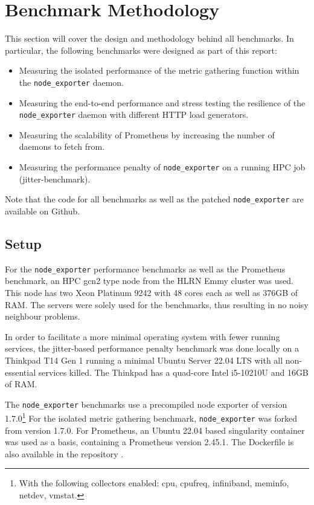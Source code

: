 \section{Benchmark Methodology}
This section will cover the design and methodology behind all benchmarks. In particular, the following
benchmarks were designed as part of this report:

\begin{itemize}
  \item Measuring the isolated performance of the metric gathering function within the \texttt{node\_exporter} daemon.
  \item Measuring the end-to-end performance and stress testing the resilience of the \texttt{node\_exporter} daemon with different HTTP load generators.
  \item Measuring the scalability of Prometheus by increasing the number of daemons to fetch from.
  \item Measuring the performance penalty of \texttt{node\_exporter} on a running \ac{HPC} job (jitter-benchmark).
\end{itemize}

Note that the code for all benchmarks \cite{my_repo} as well as the patched \texttt{node\_exporter} \cite{my_node_exporter}
are available on Github.

\subsection{Setup}

For the \texttt{node\_exporter} performance benchmarks as well as the Prometheus benchmark, an \ac{HPC} 
gcn2 type node from the HLRN Emmy cluster was used. This node has two Xeon Platinum 9242 with 48 cores each
as well as 376GB of RAM. The servers were solely used for the benchmarks, thus resulting in
no noisy neighbour problems.

In order to facilitate a more minimal operating system with fewer running services, the jitter-based 
performance penalty benchmark was done locally on a Thinkpad T14 Gen 1 running a minimal
Ubuntu Server 22.04 LTS with all non-essential services killed. The Thinkpad has a quad-core Intel i5-10210U and 16GB of RAM.

The \texttt{node\_exporter} benchmarks use a precompiled node exporter of version 1.7.0\footnote{With the following collectors enabled: cpu, cpufreq, infiniband, meminfo, netdev, vmstat.}
For the isolated metric gathering benchmark, 
\texttt{node\_exporter} was forked from version 1.7.0. For Prometheus, an Ubuntu 22.04 based singularity
container was used as a basis, containing a Prometheus version 2.45.1. The Dockerfile is also available
in the repository \cite{my_repo}.

